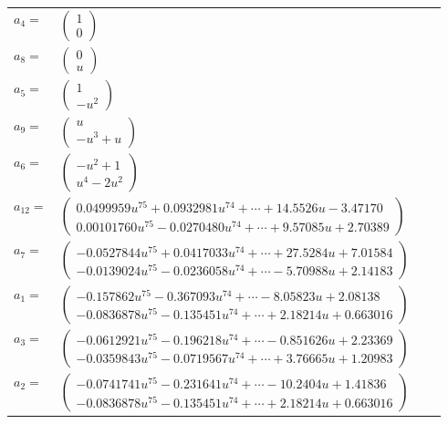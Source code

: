 \documentclass[1p]{elsarticle_modified}
\theoremstyle{definition}
\begin{document}
\begin{tabular}{m{7pt} m{180pt} m{7pt} m{180pt} }
\flushright $a_{4}=$&$\begin{pmatrix}1\\0\end{pmatrix}$ \\
\flushright $a_{8}=$&$\begin{pmatrix}0\\u\end{pmatrix}$ \\
\flushright $a_{5}=$&$\begin{pmatrix}1\\- u^2\end{pmatrix}$ \\
\flushright $a_{9}=$&$\begin{pmatrix}u\\- u^3+u\end{pmatrix}$ \\
\flushright $a_{6}=$&$\begin{pmatrix}- u^2+1\\u^4-2 u^2\end{pmatrix}$ \\
\flushright $a_{12}=$&$\begin{pmatrix}0.0499959 u^{75}+0.0932981 u^{74}+\cdots+14.5526 u-3.47170\\0.00101760 u^{75}-0.0270480 u^{74}+\cdots+9.57085 u+2.70389\end{pmatrix}$ \\
\flushright $a_{7}=$&$\begin{pmatrix}-0.0527844 u^{75}+0.0417033 u^{74}+\cdots+27.5284 u+7.01584\\-0.0139024 u^{75}-0.0236058 u^{74}+\cdots-5.70988 u+2.14183\end{pmatrix}$ \\
\flushright $a_{1}=$&$\begin{pmatrix}-0.157862 u^{75}-0.367093 u^{74}+\cdots-8.05823 u+2.08138\\-0.0836878 u^{75}-0.135451 u^{74}+\cdots+2.18214 u+0.663016\end{pmatrix}$ \\
\flushright $a_{3}=$&$\begin{pmatrix}-0.0612921 u^{75}-0.196218 u^{74}+\cdots-0.851626 u+2.23369\\-0.0359843 u^{75}-0.0719567 u^{74}+\cdots+3.76665 u+1.20983\end{pmatrix}$ \\
\flushright $a_{2}=$&$\begin{pmatrix}-0.0741741 u^{75}-0.231641 u^{74}+\cdots-10.2404 u+1.41836\\-0.0836878 u^{75}-0.135451 u^{74}+\cdots+2.18214 u+0.663016\end{pmatrix}$ \\

\end{tabular}
\end{document}
